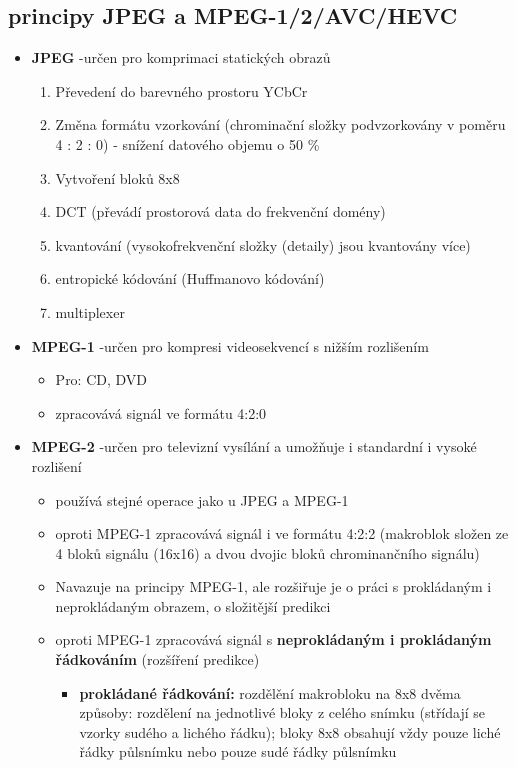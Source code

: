 \subsection{principy JPEG a MPEG-1/2/AVC/HEVC}
\begin{itemize}
	\item \textbf{JPEG} -určen pro komprimaci statických obrazů
	\begin{enumerate}
		\item Převedení do barevného prostoru YCbCr
		\item Změna formátu vzorkování (chrominační složky podvzorkovány v poměru 4 : 2 : 0) - snížení datového objemu o 50 \%
		\item Vytvoření bloků 8x8
		\item DCT (převádí prostorová data do frekvenční domény)
		\item kvantování (vysokofrekvenční složky (detaily) jsou kvantovány více)
		\item entropické kódování (Huffmanovo
		kódování)
		\item multiplexer
	\end{enumerate}
	\item \textbf{MPEG-1} -určen pro kompresi videosekvencí s nižším rozlišením
	\begin{itemize}
		\item Pro: CD, DVD
		\item zpracovává signál ve formátu 4:2:0
		
	\end{itemize}
	\item \textbf{MPEG-2} -určen pro televizní vysílání a umožňuje i standardní i vysoké rozlišení
	\begin{itemize}
		\item používá stejné operace jako u JPEG a MPEG-1
		\item oproti MPEG-1 zpracovává signál i ve formátu 4:2:2 (makroblok složen ze 4 bloků signálu (16x16) a dvou dvojic bloků chrominančního signálu)
		\item Navazuje na principy MPEG-1, ale rozšiřuje je o práci s prokládaným i neprokládaným obrazem, o složitější predikci
		\item oproti MPEG-1 zpracovává signál s \textbf{neprokládaným i	prokládaným řádkováním} (rozšíření predikce)
		\begin{itemize}
			\item \textbf{prokládané řádkování:} rozdělění makrobloku na 8x8 dvěma způsoby: rozdělení na jednotlivé bloky z celého snímku (střídají se vzorky sudého a lichého řádku); bloky 8x8 obsahují vždy pouze liché řádky půlsnímku nebo pouze sudé řádky půlsnímku 
			

\end{itemize}
\end{itemize}
\end{itemize}
